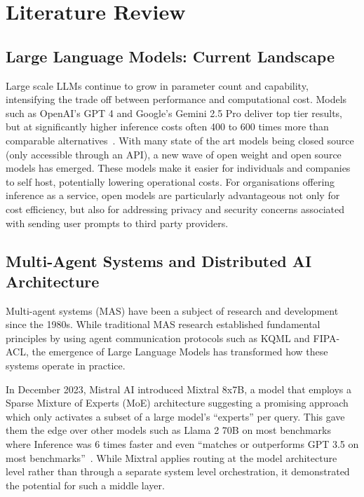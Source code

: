 \chapter{Literature Review}
\label{ch:lit_rev} %

\section{Large Language Models: Current Landscape}
Large scale LLMs continue to grow in parameter count and capability, intensifying the trade off between performance and computational cost. Models such as OpenAI's GPT 4 and Google's Gemini 2.5 Pro deliver top tier results, but at significantly higher inference costs often 400 to 600 times more than comparable alternatives~\citep{openai_costs}. With many state of the art models being closed source (only accessible through an API), a new wave of open weight and open source models has emerged. These models make it easier for individuals and companies to self host, potentially lowering operational costs. For organisations offering inference as a service, open models are particularly advantageous not only for cost efficiency, but also for addressing privacy and security concerns associated with sending user prompts to third party providers.

\section{Multi-Agent Systems and Distributed AI Architecture}
Multi-agent systems (MAS) have been a subject of research and development since the 1980s. While traditional MAS research established fundamental principles by using agent communication protocols such as KQML and FIPA-ACL, the emergence of Large Language Models has transformed how these systems operate in practice.

In December 2023, Mistral AI introduced Mixtral 8x7B, a model that employs a Sparse Mixture of Experts (MoE) architecture suggesting a promising approach which only activates a subset of a large model's ``experts'' per query. This gave them the edge over other models such as Llama 2 70B on most benchmarks where Inference was 6 times faster and even ``matches or outperforms GPT 3.5 on most benchmarks''~\citep{mixtral2024}. While Mixtral applies routing at the model architecture level rather than through a separate system level orchestration, it demonstrated the potential for such a middle layer.

